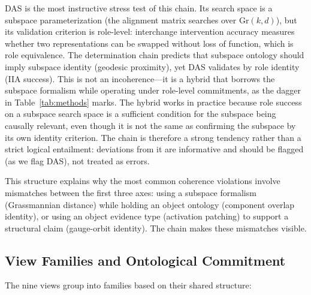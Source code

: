 \documentclass{article}
\newcommand{\Gr}{\mathrm{Gr}}
\begin{document}
DAS is the most instructive stress test of this chain.  Its search space is a subspace parameterization (the alignment matrix searches over $\Gr(k,d)$), but its validation criterion is role-level: interchange intervention accuracy measures whether two representations can be swapped without loss of function, which is role equivalence.  The determination chain predicts that subspace ontology should imply subspace identity (geodesic proximity), yet DAS validates by role identity (IIA success).  This is not an incoherence---it is a hybrid that borrows the subspace formalism while operating under role-level commitments, as the dagger in Table~\ref{tab:methods} marks.  The hybrid works in practice because role success on a subspace search space is a sufficient condition for the subspace being causally relevant, even though it is not the same as confirming the subspace by its own identity criterion.  The chain is therefore a strong tendency rather than a strict logical entailment: deviations from it are informative and should be flagged (as we flag DAS), not treated as errors.

This structure explains why the most common coherence violations involve
mismatches between the first three axes: using a subspace formalism
(Grassmannian distance) while holding an object ontology (component
overlap identity), or using an object evidence type (activation patching)
to support a structural claim (gauge-orbit identity).  The chain makes
these mismatches visible.

\subsection{View Families and Ontological Commitment}\label{sec:families}

The nine views group into families based on their shared structure:
\end{document}
